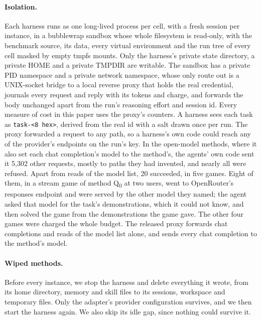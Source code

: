 \paragraph{Isolation.} Each harness runs as one long-lived process per cell, with a fresh session per instance, in a bubblewrap sandbox whose whole filesystem is read-only, with the benchmark source, its data, every virtual environment and the run tree of every cell masked by empty tmpfs mounts. Only the harness's private state directory, a private HOME and a private TMPDIR are writable. The sandbox has a private PID namespace and a private network namespace, whose only route out is a UNIX-socket bridge to a local reverse proxy that holds the real credential, journals every request and reply with its tokens and charge, and forwards the body unchanged apart from the run's reasoning effort and session id. Every measure of cost in this paper uses the proxy's counters. A harness sees each task as \texttt{task-<8 hex>}, derived from the real id with a salt drawn once per run. The proxy forwarded a request to any path, so a harness's own code could reach any of the provider's endpoints on the run's key. In the open-model methods, where it also set each chat completion's model to the method's, the agents' own code sent it 5{,}302 other requests, mostly to paths they had invented, and nearly all were refused. Apart from reads of the model list, 20 succeeded, in five games. Eight of them, in a stream game of method Q\textsubscript{0} at two users, went to OpenRouter's responses endpoint and were served by the other model they named; the agent asked that model for the task's demonstrations, which it could not know, and then solved the game from the demonstrations the game gave. The other four games were charged the whole budget. The released proxy forwards chat completions and reads of the model list alone, and sends every chat completion to the method's model.

\paragraph{Wiped methods.} Before every instance, we stop the harness and delete everything it wrote, from its home directory, memory and skill files to its sessions, workspace and temporary files. Only the adapter's provider configuration survives, and we then start the harness again. We also skip its idle gap, since nothing could survive it.

